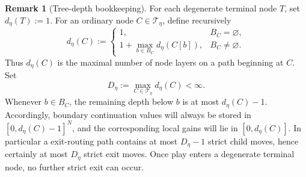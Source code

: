 \documentclass[12pt]{article}
\theoremstyle{definition}
\newtheorem{remark}[theorem]{Remark}
\newcommand{\1}{\mathbf{1}}
\newcommand{\cT}{\mathcal{T}}
\begin{document}
\begin{remark}[Tree-depth bookkeeping]
\label{rem:tree-depth}
For each degenerate terminal node $T$, set $d_\eta(T):=1$. For an ordinary node
$C\in\cT_\eta$, define recursively
\[
d_\eta(C)
:=
\begin{cases}
1, & B_C=\varnothing,\\[0.3em]
1+\max_{b\in B_C} d_\eta(C[b]), & B_C\neq \varnothing.
\end{cases}
\]
Thus $d_\eta(C)$ is the maximal number of node layers on a path beginning at $C$.
Set
\[
D_\eta:=\max_{C\in\cT_\eta} d_\eta(C)<\infty.
\]
Whenever $b\in B_C$, the remaining depth below $b$ is at most $d_\eta(C)-1$.
Accordingly, boundary continuation values will always be stored in
$[0,d_\eta(C)-1]^N$, and the corresponding local gains will lie in
$[0,d_\eta(C)]$. In particular a exit-routing path contains at most
$D_\eta-1$ strict child moves, hence certainly at most $D_\eta$ strict exit moves.
Once play enters a degenerate terminal node, no further strict exit can occur.
\end{remark}
\end{document}
